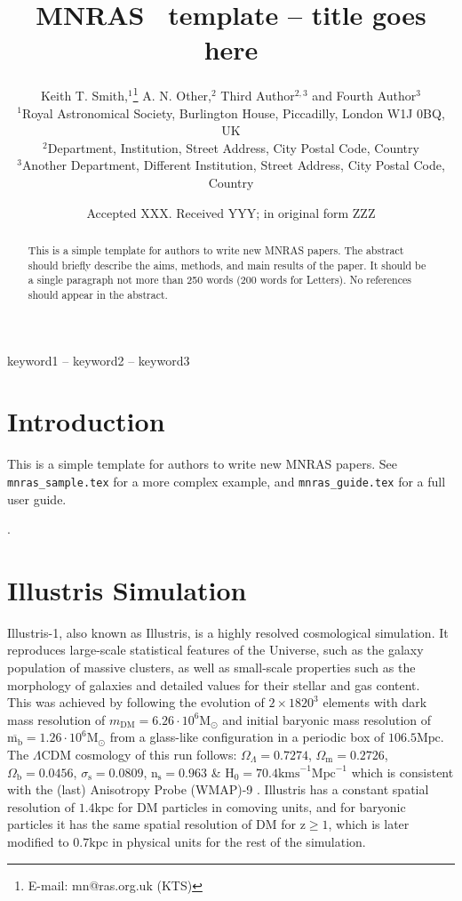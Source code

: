 \documentclass[a4paper,fleqn,usenatbib]{mnras}
\title[Short title, max. 45 characters]{MNRAS \LaTeXe\ template -- title goes here}
\author[K. T. Smith et al.]{
Keith T. Smith,$^{1}$\thanks{E-mail: mn@ras.org.uk (KTS)}
A. N. Other,$^{2}$
Third Author$^{2,3}$
and Fourth Author$^{3}$
\\
$^{1}$Royal Astronomical Society, Burlington House, Piccadilly, London W1J 0BQ, UK\\
$^{2}$Department, Institution, Street Address, City Postal Code, Country\\
$^{3}$Another Department, Different Institution, Street Address, City Postal Code, Country
}
\date{Accepted XXX. Received YYY; in original form ZZZ}
\begin{document}
\label{firstpage}
\pagerange{\pageref{firstpage}--\pageref{lastpage}}
\maketitle

\begin{abstract}
This is a simple template for authors to write new MNRAS papers.
The abstract should briefly describe the aims, methods, and main results of the paper.
It should be a single paragraph not more than 250 words (200 words for Letters).
No references should appear in the abstract.
\end{abstract}

\begin{keywords}
keyword1 -- keyword2 -- keyword3
\end{keywords}



\section{Introduction}

This is a simple template for authors to write new MNRAS papers.
See \texttt{mnras\_sample.tex} for a more complex example, and \texttt{mnras\_guide.tex}
for a full user guide.

\cite{Tweb}.

\section{Illustris Simulation}
Illustris-1, also known as Illustris, is a highly resolved
cosmological simulation. It reproduces large-scale statistical
features of the Universe, such as the galaxy population of massive
clusters, as well as small-scale properties such as the morphology of
galaxies and detailed values for their stellar and gas content.\\ 

This was achieved by following the evolution of $2 \times 1820^3$ elements with dark mass resolution of $m_{\text{DM}} = 6.26\cdot 10^6\text{M}_{\odot}$ and initial baryonic mass resolution of $\overline{\text{m}_\text{b}}=1.26\cdot 10^6\text{M}_{\odot}$ from a glass-like configuration in a periodic box of $106.5\text{Mpc}$. The $\Lambda \text{CDM}$ cosmology of this run follows: $\Omega_\Lambda=0.7274$, $\Omega_\text{m}=0.2726$, $\Omega_\text{b}=0.0456$, $\sigma_\text{s}=0.0809$, $\text{n}_\text{s}=0.963$ \& $\text{H}_0=70.4\text{kms}
^{-1}\text{Mpc}^{-1}$ which is consistent with the (last) Anisotropy
Probe (WMAP)-9 \cite{AnisotropyProbe}. Illustris has a constant
spatial resolution of $1.4\text{kpc}$ for DM particles in comoving
units, and for baryonic particles it has the same spatial resolution
of DM for $\text{z}\geq 1$, which is later modified to $0.7\text{kpc}$
in physical units for the rest of the simulation. \\ 
\end{document}
